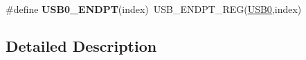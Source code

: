 \begin{DoxyCompactItemize}
\item 
\#define {\bfseries U\+S\+B0\+\_\+\+E\+N\+D\+PT}(index)~U\+S\+B\+\_\+\+E\+N\+D\+P\+T\+\_\+\+R\+EG(\hyperlink{group__USB__Peripheral__Access__Layer_gaea56c015ce8ad0cc88464060fde6d87c}{U\+S\+B0},index)\hypertarget{group__USB__Register__Accessor__Macros_gab12df1a4de08fae1e4662a2cb4060b5e}{}\label{group__USB__Register__Accessor__Macros_gab12df1a4de08fae1e4662a2cb4060b5e}

\end{DoxyCompactItemize}


\subsection{Detailed Description}
